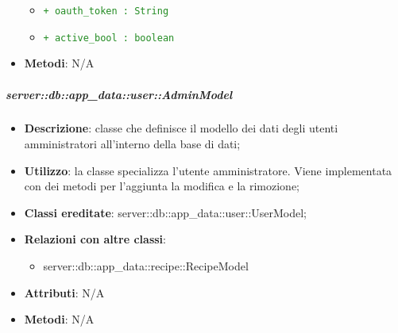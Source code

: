 \begin{itemize}
\begin{itemize}
\begin{description}
						\end{description}
						\item \textcolor{forestgreen}{\texttt{+ oauth\_token : String}}
						\item \textcolor{forestgreen}{\texttt{+ active\_bool : boolean}}
					\end{itemize}
				\item \textbf{Metodi}: N/A
			\end{itemize}


		\subparagraph{server::db::app\_data::user::AdminModel} %
		\label{subp:server_db_app_data_user_admin_model}
			\begin{itemize}
				\item \textbf{Descrizione}: classe che definisce il modello dei dati degli utenti amministratori all'interno della base di dati;
				\item \textbf{Utilizzo}: la classe specializza l'utente amministratore. Viene implementata con dei metodi per l'aggiunta la modifica e la rimozione;
				\item \textbf{Classi ereditate}: server::db::app\_data::user::UserModel;
				\item \textbf{Relazioni con altre classi}:
					\begin{itemize}
						\item server::db::app\_data::recipe::RecipeModel
					\end{itemize}
				\item \textbf{Attributi}: N/A
				\item \textbf{Metodi}: N/A
			\end{itemize}


